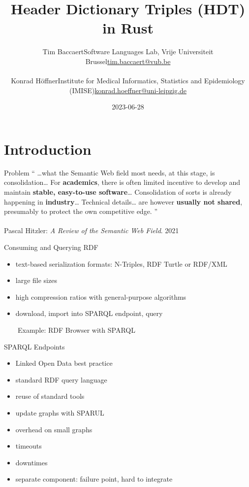 \documentclass[14pt,aspectratio=169]{beamer}
\date{2023-06-28}
\author{
\small
\texorpdfstring{Tim Baccaert\newline{}Software Languages Lab, Vrije Universiteit Brussel\newline{}\url{tim.baccaert@vub.be}}{Tim Baccaert}\\~\\
\texorpdfstring{Konrad Höffner\newline{}Institute for Medical Informatics, Statistics and Epidemiology (IMISE)\newline{}\url{konrad.hoeffner@uni-leipzig.de}}{Konrad Höffner}
}
\title{Header Dictionary Triples (HDT) in Rust}
\subtitle{}
\newcommand{\imageslide}[4][]
{
\begin{frame}[plain]{~~~~#2}
\vspace{0.2em}
\centering\makebox[\linewidth]{\texttt{[image: \#3]}}
\\#1
\note{#4}
\end{frame}
}
\newcommand\pro{\item[$+$]}
\newcommand\con{\item[$-$]}
\begin{document}
\begin{frame}
\titlepage
\end{frame}

\section{Introduction}

\begin{frame}{Problem}
\enquote{
\ldots{}what the Semantic Web field most needs, at this stage, is consolidation\ldots
For \textbf{academics}, there is often limited incentive to develop and maintain \textbf{stable, easy-to-use software}\ldots
Consolidation of sorts is already happening in \textbf{industry}\ldots
Technical details\ldots{} are however \textbf{usually not shared}, presumably to protect the own competitive edge.
}
\\~\\
Pascal Hitzler: \emph{A Review of the Semantic Web Field}. 2021
\end{frame}

\begin{frame}{Consuming and Querying RDF}
\begin{itemize}
\item text-based serialization formats: N-Triples, RDF Turtle or RDF/XML
\item large file sizes
\item high compression ratios with general-purpose algorithms
\item download, import into SPARQL endpoint, query
\end{itemize}
\end{frame}

\imageslide{Example: RDF Browser with SPARQL}{img/architecture.pdf}{}

\begin{frame}{SPARQL Endpoints}
\begin{itemize}
\pro Linked Open Data best practice
\pro standard RDF query language
\pro reuse of standard tools
\pro update graphs with SPARUL
\pause
\con overhead on small graphs
\con timeouts
\con downtimes
\con separate component: failure point, hard to integrate
\end{itemize}
\end{frame}
\end{document}
